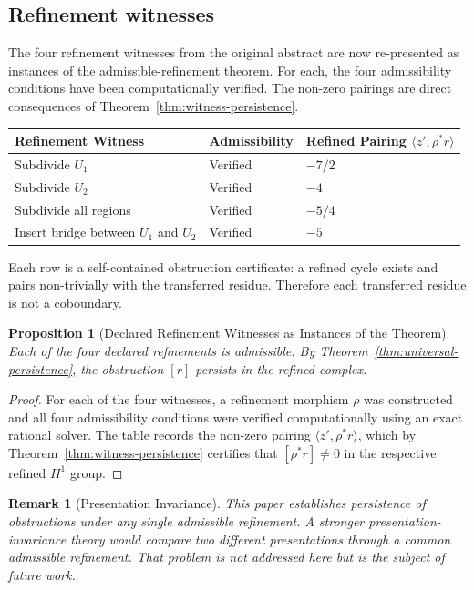 \documentclass[11pt]{article}
\newtheorem{proposition}[theorem]{Proposition}
\newtheorem{remark}[theorem]{Remark}
\begin{document}
\subsection{Refinement witnesses}

The four refinement witnesses from the original abstract are now re-presented as instances of the admissible-refinement theorem. For each, the four admissibility conditions have been computationally verified. The non-zero pairings are direct consequences of Theorem~\ref{thm:witness-persistence}.

\begin{center}
\begin{tabular}{lll}
\toprule
Refinement Witness & Admissibility & Refined Pairing \(\langle z', \rho^*r \rangle\) \\
\midrule
Subdivide \(U_1\) & Verified & \(-7/2\) \\
Subdivide \(U_2\) & Verified & \(-4\) \\
Subdivide all regions & Verified & \(-5/4\) \\
Insert bridge between \(U_1\) and \(U_2\) & Verified & \(-5\) \\
\bottomrule
\end{tabular}
\end{center}

Each row is a self-contained obstruction certificate: a refined cycle exists and pairs non-trivially with the transferred residue. Therefore each transferred residue is not a coboundary.

\begin{proposition}[Declared Refinement Witnesses as Instances of the Theorem]
Each of the four declared refinements is admissible. By Theorem~\ref{thm:universal-persistence}, the obstruction \([r]\) persists in the refined complex.
\end{proposition}
\begin{proof}
For each of the four witnesses, a refinement morphism \(\rho\) was constructed and all four admissibility conditions were verified computationally using an exact rational solver. The table records the non-zero pairing \(\langle z', \rho^*r \rangle\), which by Theorem~\ref{thm:witness-persistence} certifies that \([\rho^*r] \neq 0\) in the respective refined \(H^1\) group.
\end{proof}

\begin{remark}[Presentation Invariance]
This paper establishes persistence of obstructions under any single admissible refinement. A stronger presentation-invariance theory would compare two different presentations through a common admissible refinement. That problem is not addressed here but is the subject of future work.
\end{remark}
\end{document}

